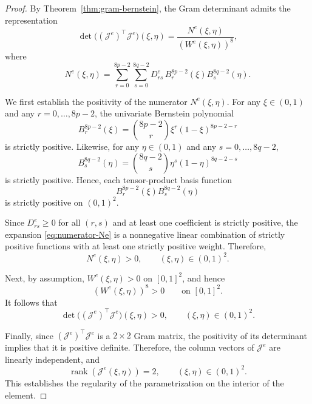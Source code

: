 \documentclass{jssc}
\begin{document}
\begin{proof}
By Theorem~\ref{thm:gram-bernstein}, the Gram determinant admits the representation
\begin{equation}
\det\!\big((\bm{\mathcal{J}}^e)^\top\bm{\mathcal{J}}^e\big)(\xi,\eta)
=
\frac{N^e(\xi,\eta)}{(W^e(\xi,\eta))^8},
\end{equation}
where
\begin{equation}
N^e(\xi,\eta)
=
\sum_{r=0}^{8p-2}\sum_{s=0}^{8q-2}
D_{rs}^e\, B_r^{8p-2}(\xi) B_s^{8q-2}(\eta).
\label{eq:numerator-Ne}
\end{equation}

We first establish the positivity of the numerator $N^e(\xi,\eta)$. 
For any $\xi\in(0,1)$ and any $r=0,\dots,8p-2$, the univariate Bernstein polynomial
\begin{equation}
B_r^{8p-2}(\xi)=\binom{8p-2}{r}\xi^r(1-\xi)^{8p-2-r}
\end{equation}
is strictly positive. Likewise, for any $\eta\in(0,1)$ and any $s=0,\dots,8q-2$,
\begin{equation}
B_s^{8q-2}(\eta)=\binom{8q-2}{s}\eta^s(1-\eta)^{8q-2-s}
\end{equation}
is strictly positive. Hence, each tensor-product basis function
\begin{equation}
B_r^{8p-2}(\xi)B_s^{8q-2}(\eta)
\end{equation}
is strictly positive on $(0,1)^2$.

Since $D_{rs}^e\ge 0$ for all $(r,s)$ and at least one coefficient is strictly positive, the expansion \eqref{eq:numerator-Ne} is a nonnegative linear combination of strictly positive functions with at least one strictly positive weight. Therefore,
\begin{equation}
N^e(\xi,\eta)>0,
\qquad
(\xi,\eta)\in(0,1)^2.
\end{equation}

Next, by assumption, $W^e(\xi,\eta)>0$ on $[0,1]^2$, and hence
\begin{equation}
(W^e(\xi,\eta))^8>0
\qquad\text{on }[0,1]^2.
\end{equation}
It follows that
\begin{equation}
\det\!\big((\bm{\mathcal{J}}^e)^\top\bm{\mathcal{J}}^e\big)(\xi,\eta)>0,
\qquad
(\xi,\eta)\in(0,1)^2.
\end{equation}

Finally, since $(\bm{\mathcal{J}}^e)^\top\bm{\mathcal{J}}^e$ is a $2\times 2$ Gram matrix, 
the positivity of its determinant implies that it is positive definite. 
Therefore, the column vectors of $\bm{\mathcal{J}}^e$ are linearly independent, and
\begin{equation}
\operatorname{rank}(\bm{\mathcal{J}}^e(\xi,\eta))=2,
\qquad
(\xi,\eta)\in(0,1)^2.
\end{equation}
This establishes the regularity of the parametrization on the interior of the element.
\end{proof}
\end{document}
